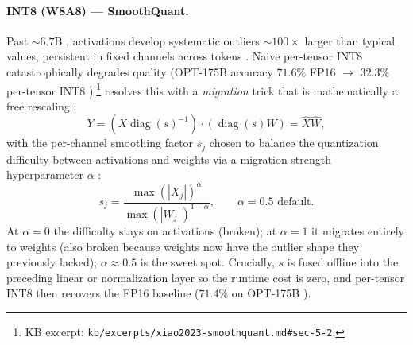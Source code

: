 \paragraph{INT8 (W8A8) --- SmoothQuant.}
Past $\sim 6.7$B ,  activations develop systematic
outliers $\sim 100\times$ larger than typical values, persistent in
fixed channels across tokens \citep[\S 3]{xiao2023-smoothquant}. Naive
per-tensor INT8 catastrophically degrades quality (OPT-175B accuracy
$71.6\%$ FP16 $\to$ $32.3\%$ per-tensor INT8
\citep[\S 5.2, Table~1]{xiao2023-smoothquant}).\footnote{KB excerpt:
\texttt{kb/excerpts/xiao2023-smoothquant.md\#sec-5-2}.}
\citet{xiao2023-smoothquant} resolves this with a \emph{migration}
trick that is mathematically a free rescaling
\citep[\S 4, Eq.~3]{xiao2023-smoothquant}:
\begin{equation}
Y = (X \operatorname{diag}(s)^{-1}) \cdot (\operatorname{diag}(s) W) = \hat{X}\hat{W},
\label{eq:smoothquant-eq}
\end{equation}
with the per-channel smoothing factor $s_j$ chosen to balance the
quantization difficulty between activations and weights via a
migration-strength hyperparameter $\alpha$
\citep[\S 4, Eq.~4]{xiao2023-smoothquant}:
\begin{equation}
s_j = \frac{\max(|X_j|)^{\alpha}}{\max(|W_j|)^{1-\alpha}},
\qquad \alpha = 0.5 \text{ default}.
\label{eq:smoothquant-s}
\end{equation}
At $\alpha = 0$ the difficulty stays on activations (broken); at
$\alpha = 1$ it migrates entirely to weights (also broken because
weights now have the outlier shape they previously lacked); $\alpha
\approx 0.5$ is the sweet spot. Crucially, $s$ is fused offline into
the preceding linear or normalization layer so the runtime cost is
zero, and per-tensor INT8 then recovers the FP16 baseline ($71.4\%$ on
OPT-175B \citep[\S 5.2, Table~1]{xiao2023-smoothquant}).

